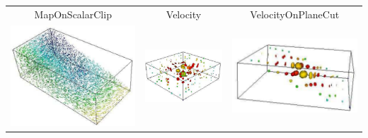 \begin{table}[ht]
\begin{tabular}{c c c}
MapOnScalarClip & Velocity & VelocityOnPlaneCut \\
\includegraphics[width=\thumbnailwidth]{figures/VelocityOnPlaneClip} & 
\includegraphics[width=\thumbnailwidth]{figures/Ellipsoid} & 
\includegraphics[width=\thumbnailwidth]{figures/EllipsoidOnPlaneCut}  \\

\end{tabular}
\end{table}
